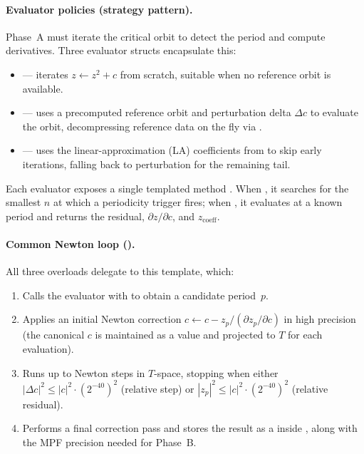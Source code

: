 \paragraph{Evaluator policies (strategy pattern).}
Phase~A must iterate the critical orbit to detect the period and compute
derivatives.  Three evaluator structs encapsulate this:
\begin{itemize}
\item {} --- iterates $z\leftarrow z^2+c$ from scratch,
  suitable when no reference orbit is available.
\item {} --- uses a precomputed reference orbit and
  perturbation delta $\Delta c$ to evaluate the orbit, decompressing
  reference data on the fly via .
\item {} --- uses the linear-approximation (LA) coefficients
  from  to skip early iterations, falling back to
  perturbation for the remaining tail.
\end{itemize}
Each evaluator exposes a single templated method .
When , it searches for the smallest $n$ at which a
periodicity trigger fires; when , it evaluates at a
known period and returns the residual, $\partial z/\partial c$, and
$z_{\mathrm{coeff}}$.

\paragraph{Common Newton loop ().}
All three  overloads delegate to this template,
which:
\begin{enumerate}
\item Calls the evaluator with  to obtain a candidate
  period~$p$.
\item Applies an initial Newton correction
  $c \leftarrow c - z_p / (\partial z_p/\partial c)$ in high precision
  (the canonical $c$ is maintained as a  value and
  projected to $T$ for each evaluation).
\item Runs up to  Newton steps in $T$-space, stopping when
  either
  $|\Delta c|^2 \le |c|^2 \cdot (2^{-40})^2$ (relative step) or
  $|z_p|^2 \le |c|^2 \cdot (2^{-40})^2$ (relative residual).
\item Performs a final correction pass and stores the result as a
   inside , along with the
  MPF precision needed for Phase~B.
\end{enumerate}

